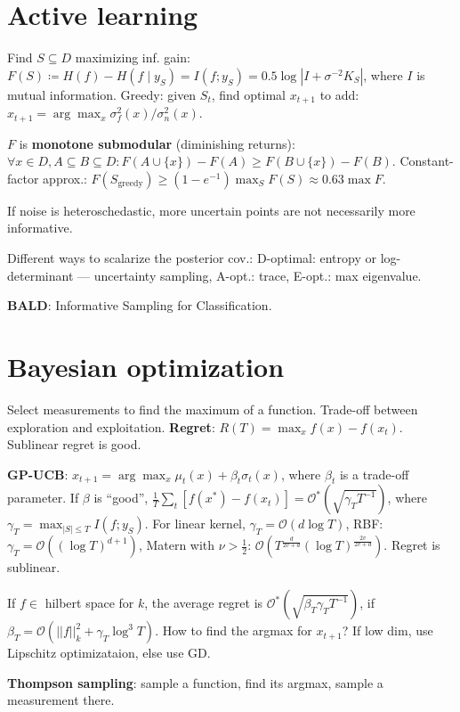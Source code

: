 \documentclass[11pt,landscape,a4paper,fleqn]{article}
\begin{document}
\begin{multicols*}{4}
\section{Active learning}

Find \(S \subseteq D\) maximizing inf. gain:
\(F(S) \coloneqq H(f) - H(f \mid y_S) = I(f; y_S) = 0.5 \log |I + \sigma^{- 2}K_S|\),
where \(I\) is mutual information.
Greedy: given \(S_t\), find optimal \(x_{t+1}\) to add: \(x_{t+1} = \arg\max_x \sigma_f^2(x) / \sigma_n^2(x)\).

\(F\) is \textbf{monotone submodular} (diminishing returns):
\(\forall x \in D, A \subseteq B \subseteq D : F(A \cup \{x\}) - F(A) \geq F(B \cup \{x\}) - F(B)\).
Constant-factor approx.: \(F(S_{\mathrm{greedy}}) \geq (1 - e^{-1}) \max_S F(S) \approx 0.63 \max F\).

If noise is heteroschedastic, more uncertain points are not necessarily more informative.

Different ways to scalarize the posterior cov.:
D-optimal: entropy or log-determinant --- uncertainty sampling,
A-opt.: trace, E-opt.: max eigenvalue.

\textbf{BALD}: Informative Sampling for Classification.

\section{Bayesian optimization}

Select measurements to find the maximum of a function.
Trade-off between exploration and exploitation.
\textbf{Regret}: \(R(T) = \max_x f(x) - f(x_t)\).
Sublinear regret is good.

\textbf{GP-UCB}: \(x_{t+1} = \arg\max_x \mu_t(x) + \beta_t \sigma_t(x)\), where \(\beta_t\) is a trade-off parameter.
If \(\beta\) is ``good'', \(\frac{1}{T} \sum_t [f(x^*) - f(x_t)] = \mathcal{O}^*(\sqrt{\gamma_T T^{-1}})\), where
\(\gamma_T = \max_{|S| \leq T} I(f; y_S)\).
For linear kernel, \(\gamma_T = \mathcal{O}(d \log T)\), RBF: \(\gamma_T = \mathcal{O}((\log T)^{d+1})\),
Matern with \(\nu > \frac{1}{2}\): \(\mathcal{O}(T^{\frac{d}{2v + d}} (\log T)^{\frac{2v}{2v + d}})\).
Regret is sublinear.

If \(f \in \) hilbert space for \(k\), the average regret is \(\mathcal{O}^*(\sqrt{\beta_T \gamma_T T^{-1}})\),
if \(\beta_T = \mathcal{O}(||f||_k^2 + \gamma_T \log^3 T)\).
How to find the argmax for \(x_{t+1}\)? If low dim, use Lipschitz optimizataion, else use GD.

\textbf{Thompson sampling}: sample a function, find its argmax, sample a measurement there.


\end{multicols*}
\end{document}

